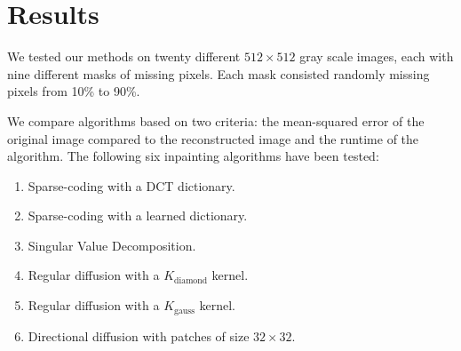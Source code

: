 \section{Results}
\label{sec:results}

We tested our methods on twenty different $512\times 512$ gray scale images, each with nine different masks of missing pixels. Each mask consisted randomly missing pixels from 10\% to 90\%.

We compare algorithms based on two criteria: the mean-squared error of the original image compared to the reconstructed image and the runtime of the algorithm. The following six inpainting algorithms have been tested:
\begin{enumerate}
	\item Sparse-coding with a DCT dictionary.
	\item Sparse-coding with a learned dictionary.
	\item Singular Value Decomposition.
	\item Regular diffusion with a $K_{\text{diamond}}$ kernel.
	\item Regular diffusion with a $K_{\text{gauss}}$ kernel.
	\item Directional diffusion with patches of size $32 \times 32$.
\end{enumerate}

